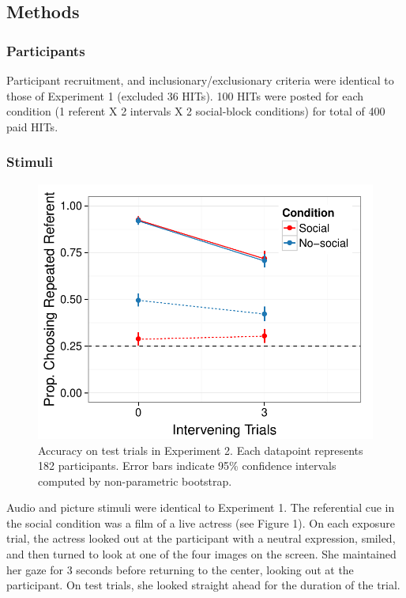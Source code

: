 \documentclass[10pt,letterpaper]{article}
\begin{document}
\subsection{Methods}

\subsubsection{Participants}

Participant recruitment, and inclusionary/exclusionary criteria were identical to those of Experiment 1 (excluded 36 HITs). 100 HITs were posted for each condition (1 referent X 2 intervals X 2 social-block conditions) for total of 400 paid HITs.  

\subsubsection{Stimuli}

\begin{figure}[t!]
\begin{center}
\includegraphics[scale=0.45]{plots_figs/acc-test-expt2}
\end{center}
\caption{Accuracy on test trials in Experiment 2. Each datapoint represents 182 participants. Error bars indicate 95\% confidence intervals computed by non-parametric bootstrap.}
\end{figure}

Audio and picture stimuli were identical to Experiment 1. The referential cue in the social condition was a film of a live actress (see Figure 1). On each exposure trial, the actress looked out at the participant with a neutral expression, smiled, and then turned to look at one of the four images on the screen. She maintained her gaze for 3 seconds before returning to the center, looking out at the participant. On test trials, she looked straight ahead for the duration of the trial. 
\end{document}
